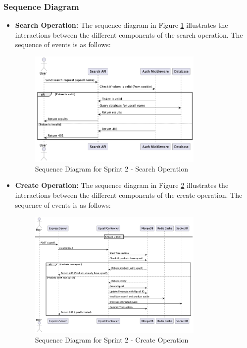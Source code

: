 \subsubsection{Sequence Diagram}

\begin{itemize}
    \item \textbf{Search Operation:} The sequence diagram in Figure \ref{fig:sequence_diagram_sprint2_search} illustrates the interactions between the different components of the search operation. The sequence of events is as follows:
    \begin{figure}[H]
        \centering
        \includegraphics[width=0.8\textwidth]{images/sprintTwoSearchSequence.png}
        \caption{Sequence Diagram for Sprint 2 - Search Operation}
        \label{fig:sequence_diagram_sprint2_search}
    \end{figure}

    \item \textbf{Create Operation:} The sequence diagram in Figure \ref{fig:sequence_diagram_sprint2_create} illustrates the interactions between the different components of the create operation. The sequence of events is as follows:
    \begin{figure}[H]
        \centering
        \includegraphics[width=0.8\textwidth]{images/sprintTwoCreateSequence.png}
        \caption{Sequence Diagram for Sprint 2 - Create Operation}
        \label{fig:sequence_diagram_sprint2_create}
    \end{figure}


\end{itemize}

